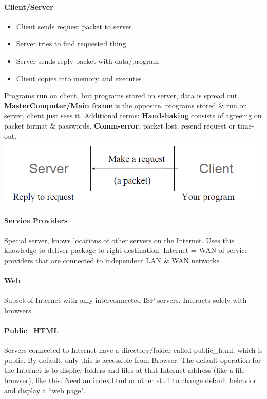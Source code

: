 \documentclass[12 pt]{article}
\begin{document}
	\paragraph{Client/Server}
	\begin{itemize}
		\item Client sends request packet to server
		\item Server tries to find requested thing
		\item Server sends reply packet with data/program
		\item Client copies into memory and executes
	\end{itemize}
	Programs run on client, but programs stored on server, data is spread out. \textbf{MasterComputer/Main frame} is the opposite, programs stored \& run on server, client just sees it.
	Additional terms: \textbf{Handshaking} consists of agreeing on packet format \& passwords. \textbf{Comm-error}, packet lost, resend request or time-out. \includegraphics[scale=0.3]{cs}
	\paragraph{Service Providers} Special server, knows locations of other servers on the Internet. Uses this knowledge to deliver package to right destination. Internet = WAN of service providers that are connected to independent LAN \& WAN networks.
	\paragraph{Web} Subset of Internet with only interconnected ISP servers. Interacts solely with browsers.
	\paragraph{Public\_HTML} Servers connected to Internet have a directory/folder called public\_html, which is public. By default, only this is accessible from Browser. The default operation for the Internet is to display folders and files at that Internet address (like a file-browser), like \href{https://www.kernel.org/pub/software/scm/git/}{this}. Need an index.html or other stuff to change default behavior and display a ``web page".
\end{document}
